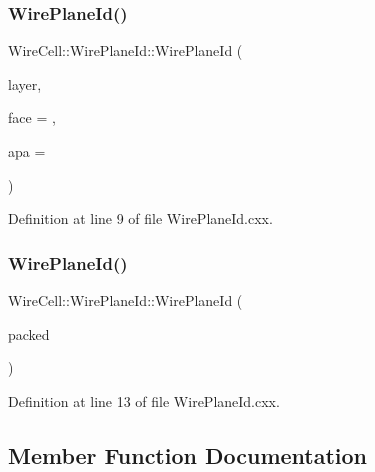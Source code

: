 \subsubsection{\texorpdfstring{Wire\+Plane\+Id()}{WirePlaneId()}\hspace{0.1cm}{\footnotesize\ttfamily [1/2]}}
{\footnotesize\ttfamily Wire\+Cell\+::\+Wire\+Plane\+Id\+::\+Wire\+Plane\+Id (\begin{DoxyParamCaption}\item[{\hyperlink{namespace_wire_cell_a761397ff086f0a7e1a1d9ccd251ac618}{Wire\+Plane\+Layer\+\_\+t}}]{layer,  }\item[{int}]{face = {},  }\item[{int}]{apa = {} }\end{DoxyParamCaption})\hspace{0.3cm}{\ttfamily [explicit]}}



Definition at line 9 of file Wire\+Plane\+Id.\+cxx.

\mbox{\label{class_wire_cell_1_1_wire_plane_id_a24c2311e0872adaad69aebac4eb83270}} 
\subsubsection{\texorpdfstring{Wire\+Plane\+Id()}{WirePlaneId()}\hspace{0.1cm}{\footnotesize\ttfamily [2/2]}}
{\footnotesize\ttfamily Wire\+Cell\+::\+Wire\+Plane\+Id\+::\+Wire\+Plane\+Id (\begin{DoxyParamCaption}\item[{int}]{packed }\end{DoxyParamCaption})\hspace{0.3cm}{\ttfamily [explicit]}}



Definition at line 13 of file Wire\+Plane\+Id.\+cxx.



\subsection{Member Function Documentation}
\mbox{\label{class_wire_cell_1_1_wire_plane_id_a868dff2296e2531a30732a0528054be2}} 
